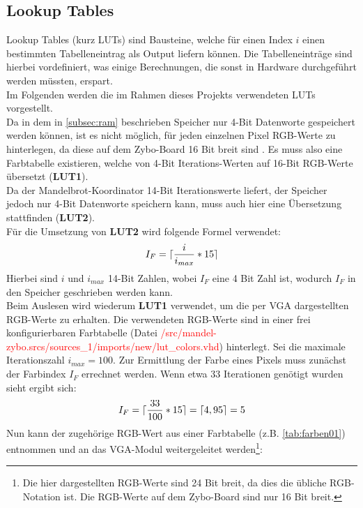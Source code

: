 \documentclass[a4paper,12pt,onesided]{report}
\begin{document}
\subsection{Lookup Tables}
\label{subsec:luts}
Lookup Tables (kurz LUTs) sind Bausteine, welche für einen Index $i$ einen bestimmten Tabelleneintrag als Output liefern können.
Die Tabelleneinträge sind hierbei vordefiniert, was einige Berechnungen, die sonst in Hardware durchgeführt werden müssten, erspart.\\
Im Folgenden werden die im Rahmen dieses Projekts %
verwendeten LUTs vorgestellt.\\
Da in dem in \autoref{subsec:ram} beschrieben Speicher nur 4-Bit Datenworte gespeichert werden können, ist es nicht möglich, für jeden einzelnen Pixel RGB-Werte zu hinterlegen, da diese auf dem Zybo-Board 16 Bit breit sind \cite{zyboref}. Es muss also eine Farbtabelle existieren, welche von 4-Bit Iterations-Werten auf 16-Bit RGB-Werte übersetzt (\textbf{LUT1}).\\
Da der Mandelbrot-Koordinator 14-Bit Iterationswerte liefert, der Speicher jedoch nur 4-Bit %
Datenworte speichern kann, muss auch hier eine Übersetzung stattfinden (\textbf{LUT2}).\\
Für die Umsetzung von \textbf{LUT2} wird folgende Formel verwendet:
\[I_F = \lceil\frac{i}{i_{max}}*15\rceil\]
Hierbei sind $i$ und $i_{max}$ 14-Bit Zahlen, wobei $I_F$ eine 4 Bit Zahl ist, wodurch $I_F$ in den Speicher geschrieben werden kann.\\
Beim Auslesen wird wiederum \textbf{LUT1} verwendet, um die per VGA dargestellten RGB-Werte zu erhalten.
Die verwendeten RGB-Werte sind in einer frei konfigurierbaren Farbtabelle (Datei \textcolor{red}{/src/mandel-zybo.srcs/sources\_1/imports/new/lut\_colors.vhd}) hinterlegt.
Sei die maximale Iterationszahl $i_{max} = 100$.
Zur Ermittlung der Farbe eines Pixels muss zunächst der Farbindex $I_F$ errechnet werden. Wenn etwa 33 Iterationen genötigt wurden sieht ergibt sich:
\[I_F = \lceil\frac{33}{100}*15\rceil = \lceil4,95\rceil = 5\]
Nun kann der zugehörige RGB-Wert aus einer Farbtabelle (z.B. \autoref{tab:farben01}) entnommen und an das VGA-Modul weitergeleitet werden\footnote{Die hier dargestellten RGB-Werte sind 24 Bit breit, da dies die übliche RGB-Notation ist. Die RGB-Werte auf dem Zybo-Board sind nur 16 Bit breit.}:
\end{document}
